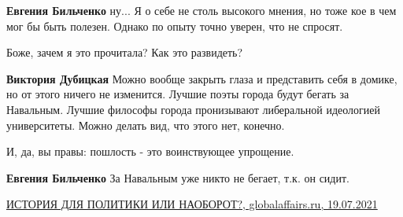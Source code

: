 \begin{itemize}
\begin{itemize}
\textbf{Евгения Бильченко} ну... Я о себе не столь высокого мнения, но тоже кое
в чем мог бы быть полезен. Однако по опыту точно уверен, что не спросят.

\end{itemize}

 
Боже, зачем я это прочитала? Как это развидеть?

\begin{itemize}
 
\textbf{Виктория Дубицкая} Можно вообще закрыть глаза и представить себя в
домике, но от этого ничего не изменится. Лучшие поэты города будут бегать за
Навальным. Лучшие философы города пронизывают либеральной идеологией
университеты. Можно делать вид, что этого нет, конечно.

 
И, да, вы правы: пошлость - это воинствующее упрощение.

 
\textbf{Евгения Бильченко} За Навальным уже никто не бегает, т.к. он сидит.
\end{itemize}

 
\href{https://globalaffairs.ru/articles/istoriya-dlya-politiki/}{%
ИСТОРИЯ ДЛЯ ПОЛИТИКИ ИЛИ НАОБОРОТ?, globalaffairs.ru, 19.07.2021%
}


\end{itemize}
